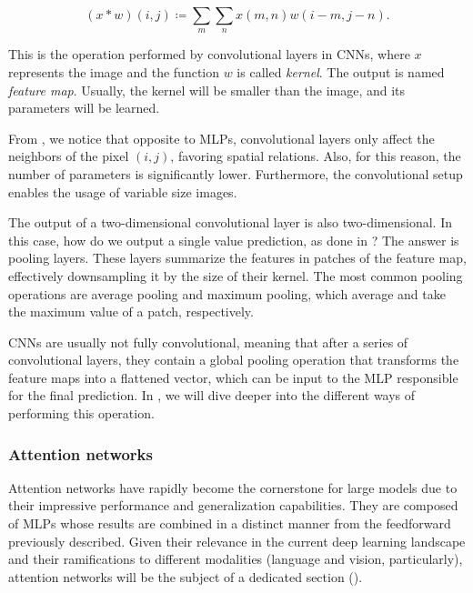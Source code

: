 \begin{equation}
    (x\ast w)(i,j)\coloneqq \sum_m\sum_n x(m,n) w(i-m, j-n).
    \label{eq:convolution_2d}
\end{equation}

This is the operation performed by convolutional layers in CNNs, where $x$ represents the image and the function $w$ is called \textit{kernel}. The output is named \textit{feature map}. Usually, the kernel will be smaller than the image, and its parameters will be learned.

From , we notice that opposite to MLPs, convolutional layers only affect the neighbors of the pixel $(i, j)$, favoring spatial relations. Also, for this reason, the number of parameters is significantly lower. Furthermore, the convolutional setup enables the usage of variable size images. 

The output of a two-dimensional convolutional layer is also two-dimensional. In this case, how do we output a single value prediction, as done in ? The answer is pooling layers. These layers summarize the features in patches of the feature map, effectively downsampling it by the size of their kernel. The most common pooling operations are average pooling and maximum pooling, which average and take the maximum value of a patch, respectively.


CNNs are usually not fully convolutional, meaning that after a series of convolutional layers, they contain a global pooling operation that transforms the feature maps into a flattened vector, which can be input to the MLP responsible for the final prediction. In , we will dive deeper into the different ways of performing this operation. 

\subsubsection{Attention networks}
\label{subsub:attention}
Attention networks have rapidly become the cornerstone for large models due to their impressive performance and generalization capabilities. They are composed of MLPs whose results are combined in a distinct manner from the feedforward previously described. Given their relevance in the current deep learning landscape and their ramifications to different modalities (language and vision, particularly), attention networks will be the subject of a dedicated section ().

